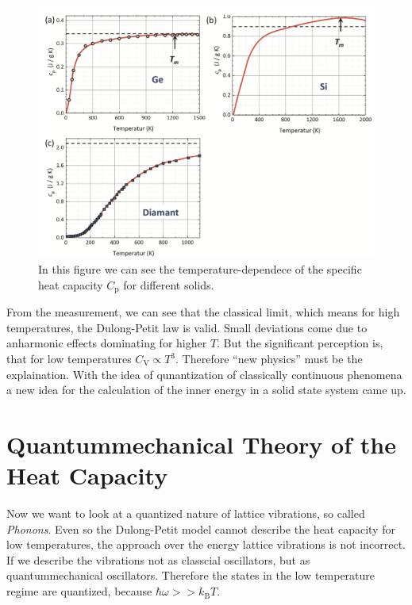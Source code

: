 \begin{figure}
    \centering
    \includegraphics[scale=0.4]{content/V47_pictures/heat_capacity.png}
    \caption{In this figure we can see the temperature-dependece of the specific heat capacity $C_\mathrm{p}$ for different solids. \cite{grossmarx}}
    \label{fig:heat_cap_measurement}
\end{figure}

From the measurement, we can see that the classical limit, which means for high temperatures, the Dulong-Petit law is valid. Small deviations come due to anharmonic effects dominating
for higher $T$. But the significant perception is, that for low temperatures $C_\mathrm{V} \propto T^3$. Therefore \enquote{new physics} must be the explaination. With the idea of qunantization
of classically continuous phenomena a new idea for the calculation of the inner energy in a solid state system came up.

\section{Quantummechanical Theory of the Heat Capacity}
\label{sec:quantum}
Now we want to look at a quantized nature of lattice vibrations, so called \textit{Phonons}. Even so the Dulong-Petit model cannot describe the heat capacity for low temperatures, the approach over the energy 
lattice vibrations is not incorrect. If we describe the vibrations not as classcial oscillators, but as quantummechanical oscillators. Therefore the states in the low temperature regime 
are quantized, because $\hbar\omega >> k_\mathrm{B}T$.
